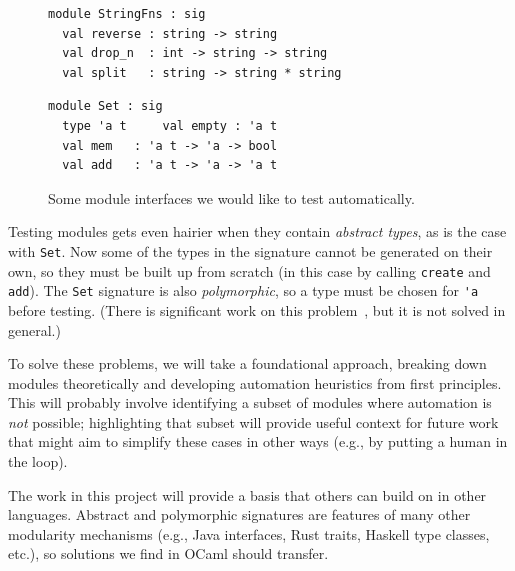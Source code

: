 \begin{figure}[t]
  \begin{minipage}{.45\textwidth}
\begin{lstlisting}
module StringFns : sig
  val reverse : string -> string
  val drop_n  : int -> string -> string
  val split   : string -> string * string
\end{lstlisting}
  \end{minipage}
  \qquad\qquad
  \begin{minipage}{.45\textwidth}
\begin{lstlisting}
module Set : sig
  type 'a t     val empty : 'a t
  val mem   : 'a t -> 'a -> bool
  val add   : 'a t -> 'a -> 'a t
\end{lstlisting}
  \end{minipage}
  \vspace{-2mm}
  \caption{Some module interfaces we would like to test
    automatically.}\label{fig:sigs}
\end{figure}

Testing modules gets even hairier when they contain {\em abstract types}, as is
the case with \lstinline{Set}. Now some of the types in the signature cannot be
generated on their own, so they must be built up from scratch (in this case by
calling \lstinline{create} and \lstinline{add}). The \lstinline{Set} signature is
also {\em polymorphic}, so a type must be chosen for \lstinline{'a} before
testing. (There is significant work on this
problem~\cite{hou_favonia_logarithm_2022}, but it is not solved in general.)

To solve these problems, we will take a foundational approach, breaking down
modules theoretically and developing automation heuristics from first
principles. This will probably\iflater{}\fi{} involve identifying a subset of
modules where automation is {\em not} possible; highlighting that subset will
provide useful context for future work that might aim to simplify these cases in
other ways (e.g., by putting a human in the loop).

The work in this project will provide a basis that others can build on
in other languages. Abstract and polymorphic signatures are features
of many other modularity mechanisms (e.g., Java interfaces, Rust
traits, Haskell type classes, etc.), so solutions we find in OCaml
should transfer. \ifnext {}
 \fi

